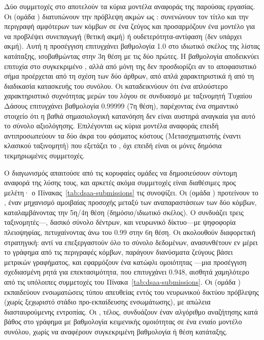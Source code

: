 Δύο συμμετοχές στο  αποτελούν τα κύρια μοντέλα αναφοράς της παρούσας
εργασίας.
Οι \textcite{phan2023link} (ομάδα ) διατυπώνουν την πρόβλεψη
ακμών ως : συνενώνουν τον τίτλο και την περιγραφή
αμφότερων των κόμβων σε ένα ζεύγος  και προσαρμόζουν ένα μοντέλο
 για να προβλέψει συνεπαγωγή (θετική ακμή) ή ουδετερότητα-αντίφαση
(δεν υπάρχει ακμή).
Αυτή η προσέγγιση επιτυγχάνει βαθμολογία  1.0 στο ιδιωτικό
σκέλος της λίστας κατάταξης, ισοβαθμώντας στην 3η θέση με τις δύο πρώτες.
Η
βαθμολογία αποδεικνύει επιτυχία στο συγκεκριμένο , αλλά από μόνη
της δεν προσδιορίζει αν το αποφασιστικό σήμα προέρχεται από τη σχέση των δύο
άρθρων, από απλά χαρακτηριστικά ή από τη διαδικασία κατασκευής του συνόλου.
Οι \textcite{tran2023text} καταδεικνύουν
ότι ένα απλούστερο χαρακτηριστικό συχνότητας μερών του λόγου σε συνδυασμό με
ταξινομητή Τυχαίου Δάσους επιτυγχάνει βαθμολογία  0.99999 (7η θέση),
παρέχοντας ένα σημαντικό στοιχείο ότι η βαθιά σημασιολογική κατανόηση δεν είναι αυστηρά
αναγκαία για αυτό το σύνολο αξιολόγησης.
Επιλέγονται ως κύρια μοντέλα αναφοράς επειδή
αντιπροσωπεύουν τα δύο άκρα του φάσματος κόστους (Μετασχηματιστής έναντι κλασικού
ταξινομητή) που εξετάζει το , όχι επειδή είναι οι μόνες δημόσια
τεκμηριωμένες συμμετοχές.

Ο διαγωνισμός απαιτούσε από τις κορυφαίες ομάδες να δημοσιεύσουν σύντομη αναφορά της
λύσης τους, και αρκετές ακόμα συμμετοχές είναι διαθέσιμες προς μελέτη· ο
Πίνακας~\ref{tab:dsaa-submissions} τις συνοψίζει.
Οι \textcite{nguyen2023mat} (ομάδα
) προτείνουν το , έναν
μηχανισμό αμοιβαίας προσοχής μεταξύ των αναπαραστάσεων των δύο κόμβων, καταλαμβάνοντας
την 5η/4η θέση (δημόσιο/ιδιωτικό σκέλος).
Ο \textcite{yang2023achieving} συνδυάζει
τρεις ταξινομητές---, δασικό σύνολο δέντρων, και νευρωνικό
δίκτυο---με ψηφοφορία πλειοψηφίας, πετυχαίνοντας  άνω του 0.99 στην 6η
θέση.
Οι \textcite{giannoulidis2023enhanced} ακολουθούν διαφορετική στρατηγική:
αντί να επεξεργαστούν όλο το σύνολο δεδομένων, ανασυνθέτουν εν μέρει το γράφημα από τις
περιγραφές κόμβων, παράγουν διανύσματα ζεύγους βάσει μετρικών γραφήματος, και εφαρμόζουν
ένα κατώφλι ομοιότητας ---μια προσέγγιση σχεδιασμένη ρητά για επεκτασιμότητα,
που επιτυγχάνει  0.948, αισθητά χαμηλότερο από τις υπόλοιπες συμμετοχές
του Πίνακα~\ref{tab:dsaa-submissions}.
Οι \textcite{mata2023link} (ομάδα )
εκπαιδεύουν ενσωματώσεις τύπου  απευθείας εντός του νευρωνικού δικτύου
πρόβλεψης (χωρίς ξεχωριστό στάδιο προ-εκπαίδευσης ενσωμάτωσης), με απώλεια διασταυρούμενης
εντροπίας.
Οι \textcite{kansal2023predict}, τέλος, συνδυάζουν έναν αλγόριθμο αναζήτησης
κατά βάθος στο γράφημα με βαθμολογία κειμενικής ομοιότητας σε ένα ενιαίο μοντέλο
συνόλου, χωρίς να αναφέρουν συγκεκριμένη βαθμολογία ή θέση κατάταξης.

